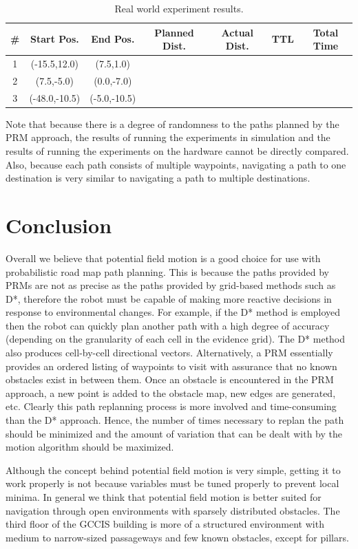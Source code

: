 \documentclass[12pt]{article}
\begin{document}
\newpage

\begin{table}[h]
\centering
\begin{tabular}{| c | c | c | c | c | c | c |}
\hline
{\#} & Start Pos. & End Pos. & Planned Dist. & Actual Dist. & TTL & Total Time \\ 
\hline 
1 & (-15.5,12.0) & (7.5,1.0) & & & & \\
\hline 
2 & (7.5,-5.0) & (0.0,-7.0) & & & & \\
\hline 
3 & (-48.0,-10.5) & (-5.0,-10.5) & & & & \\
\hline
\end{tabular}
\caption{Real world experiment results.}
\label{tab:realresults}
\end{table}

Note that because there is a degree of randomness to the paths planned by the PRM approach, the results of running the experiments in simulation and the results of running the experiments on the hardware cannot be directly compared. Also, because each path consists of multiple waypoints, navigating a path to one destination is very similar to navigating a path to multiple destinations.


\section{Conclusion}

Overall we believe that potential field motion is a good choice for use with probabilistic road map path planning. This is because the paths provided by PRMs are not as precise as the paths provided by grid-based methods such as D*, therefore the robot must be capable of making more reactive decisions in response to environmental changes. For example, if the D* method is employed then the robot can quickly plan another path with a high degree of accuracy (depending on the granularity of each cell in the evidence grid). The D* method also produces cell-by-cell directional vectors. Alternatively, a PRM essentially provides an ordered listing of waypoints to visit with assurance that no known obstacles exist in between them. Once an obstacle is encountered in the PRM approach, a new point is added to the obstacle map, new edges are generated, etc. Clearly this path replanning process is more involved and time-consuming than the D* approach. Hence, the number of times necessary to replan the path should be minimized and the amount of variation that can be dealt with by the motion algorithm should be maximized.

Although the concept behind potential field motion is very simple, getting it to work properly is not because variables must be tuned properly to prevent local minima. In general we think that potential field motion is better suited for navigation through open environments with sparsely distributed obstacles. The third floor of the GCCIS building is more of a structured environment with medium to narrow-sized passageways and few known obstacles, except for pillars. 
\end{document}
